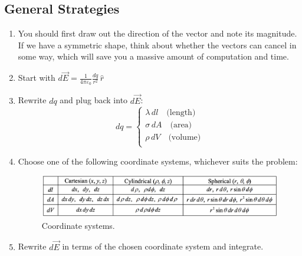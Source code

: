 \documentclass[11pt, letterpaper]{article}
\begin{document}
	\subsection{General Strategies}
	
	\renewcommand{\theenumi}{\Roman{enumi}}
	\begin{enumerate}
	
	\item You should first draw out the direction of the vector and note its magnitude. If we have a
	symmetric shape, think about whether the vectors can cancel in some way, which will 
	save you a massive amount of computation and time.
	
	\item Start with $d\vec{E} = \frac{1}{4\pi\varepsilon_0}\frac{dq}{r^2}\,\hat{r}$
	\item Rewrite $dq$ and plug back into $d\vec{E}$:
		\begin{equation}		
			dq= \begin{cases}
				\lambda\,dl \quad \text{(length)}\\
    				\sigma\,dA \quad \text{(area)}\\
    				\rho\,dV \quad \text{(volume)}\\
			 \end{cases}
		\end{equation}
	\item Choose one of the following coordinate systems, whichever suits the problem:
	\begin{figure}[h!]
		\centering
		\includegraphics[scale=0.7]{coordinates}
		\caption{Coordinate systems.}
		\label{fig:coordinates}
	\end{figure}
	\item Rewrite $d\vec{E}$ in terms of the chosen coordinate system and integrate.
	\end{enumerate}
	
	\newpage
\end{document}
